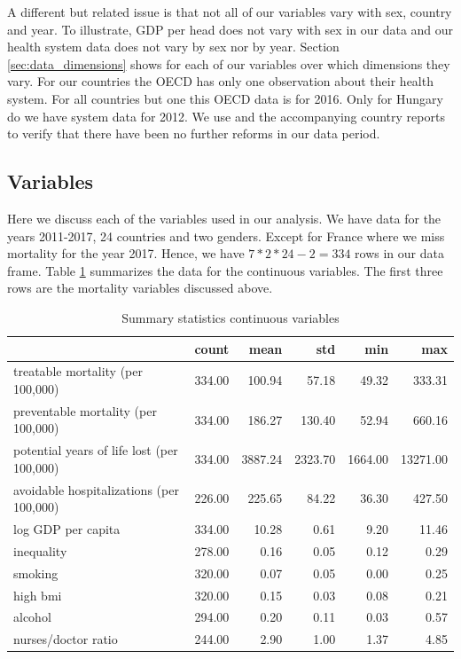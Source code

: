 \documentclass[12pt,english,a4paper]{article}
\begin{document}
A different but related issue is that not all of our variables vary with sex, country and year. To illustrate, GDP per head does not vary with sex in our data and our health system data does not vary by sex nor by year. Section \ref{sec:data_dimensions} shows for each of our variables over which dimensions they vary. For our countries the OECD has only one observation about their health system. For all countries but one this OECD data is for 2016. Only for Hungary do we have system data for 2012. We use \cite{countryprofileReport} and the accompanying country reports to verify that there have been no further reforms in our data period.


\subsection{Variables}
\label{sec:org0d95c70}

Here we discuss each of the variables used in our analysis. We have data for the years 2011-2017, 24 countries and two genders. Except for France where we miss mortality for the year 2017. Hence, we have \(7*2*24-2=334\) rows in our data frame. Table \ref{tab:org53a5a50} summarizes the data for the continuous variables. The first three rows are the mortality variables discussed above.

\begin{table}[htbp]
\caption{\label{tab:org53a5a50}Summary statistics continuous variables}
\centering
\begin{tabular}{lrrrrr}
 & count & mean & std & min & max\\
\hline
treatable mortality (per 100,000) & 334.00 & 100.94 & 57.18 & 49.32 & 333.31\\
preventable mortality (per 100,000) & 334.00 & 186.27 & 130.40 & 52.94 & 660.16\\
potential years of life lost (per 100,000) & 334.00 & 3887.24 & 2323.70 & 1664.00 & 13271.00\\
avoidable hospitalizations (per 100,000) & 226.00 & 225.65 & 84.22 & 36.30 & 427.50\\
log GDP per capita & 334.00 & 10.28 & 0.61 & 9.20 & 11.46\\
inequality & 278.00 & 0.16 & 0.05 & 0.12 & 0.29\\
smoking & 320.00 & 0.07 & 0.05 & 0.00 & 0.25\\
high bmi & 320.00 & 0.15 & 0.03 & 0.08 & 0.21\\
alcohol & 294.00 & 0.20 & 0.11 & 0.03 & 0.57\\
nurses/doctor ratio & 244.00 & 2.90 & 1.00 & 1.37 & 4.85\\
\end{tabular}
\end{table}
\end{document}
